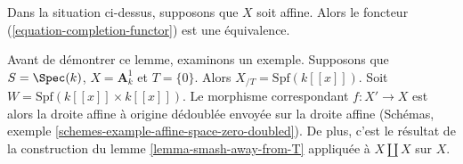 \begin{lemma}
\label{lemma-dilatations-affine}
Dans la situation ci-dessus, supposons que $X$ soit affine. Alors le foncteur
(\ref{equation-completion-functor}) est une équivalence.
\end{lemma}

\noindent
Avant de démontrer ce lemme, examinons un exemple. Supposons que
$S = \Spec(k)$, $X = \mathbf{A}^1_k$ et $T = \{0\}$. Alors
$X_{/T} = \text{Spf}(k[[x]])$. Soit $W = \text{Spf}(k[[x]] \times k[[x]])$.
Le morphisme correspondant $f : X' \to X$ est alors la droite affine à
origine dédoublée envoyée sur la droite affine
(Schémas, exemple \ref{schemes-example-affine-space-zero-doubled}).
De plus, c'est le résultat de la construction du
lemme \ref{lemma-smash-away-from-T}
appliquée à $X \amalg X$ sur $X$.

